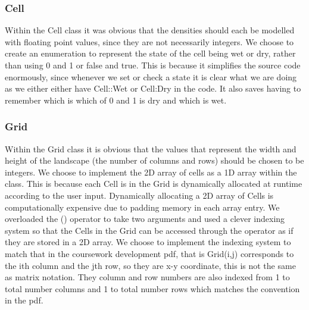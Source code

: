 \subsubsection{Cell}
Within the Cell class it was obvious that the densities should each be modelled with floating point values, since they are not necessarily integers. We choose to create an enumeration to represent the state of the cell being wet or dry, rather than using 0 and 1 or false and true. This is because it simplifies the source code enormously, since whenever we set or check a state it is clear what we are doing as we either either have Cell::Wet or Cell:Dry in the code. It also saves having to remember which is which of 0 and 1 is dry and which is wet. 

\subsubsection{Grid}
Within the Grid class it is obvious that the values that represent the width and height of the landscape (the number of columns and rows) should be chosen to be integers. We choose to implement the 2D array of cells as a 1D array within the class. This is because each Cell is in the Grid is dynamically allocated at runtime according to the user input. Dynamically allocating a 2D array of Cells is computationally expensive due to padding memory in each array entry. We overloaded the () operator to take two arguments and used a clever indexing system so that the Cells in the Grid can be accessed through the operator as if they are stored in a 2D array. We choose to implement the indexing system to match that in the coursework development pdf, that is Grid(i,j) corresponds to the ith column and the jth row, so they are x-y coordinate, this is not the same as matrix notation. They column and row numbers are also indexed from 1 to total number columns and 1 to total number rows which matches the convention in the pdf.



